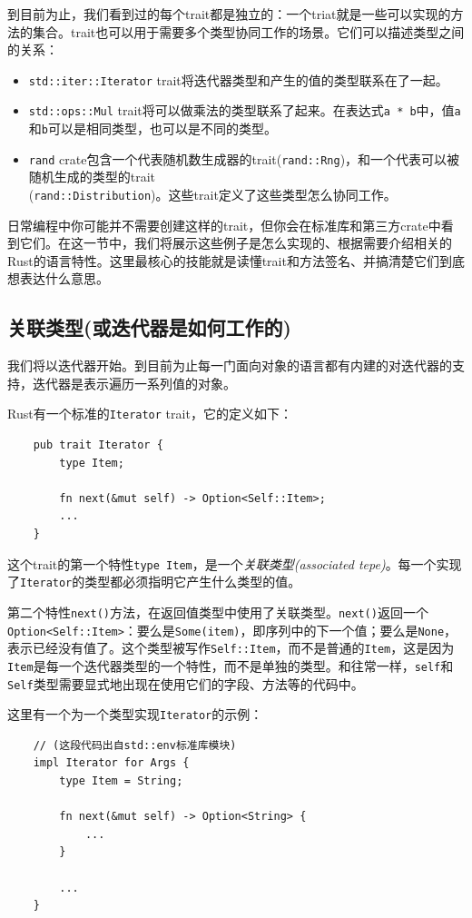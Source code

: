 到目前为止，我们看到过的每个trait都是独立的：一个triat就是一些可以实现的方法的集合。trait也可以用于需要多个类型协同工作的场景。它们可以描述类型之间的关系：
\begin{itemize}
    \item \texttt{std::iter::Iterator} trait将迭代器类型和产生的值的类型联系在了一起。
    \item \texttt{std::ops::Mul} trait将可以做乘法的类型联系了起来。在表达式\texttt{a * b}中，值\texttt{a}和\texttt{b}可以是相同类型，也可以是不同的类型。
    \item \texttt{rand} crate包含一个代表随机数生成器的trait(\texttt{rand::Rng})，和一个代表可以被随机生成的类型的trait\\
    (\texttt{rand::Distribution})。这些trait定义了这些类型怎么协同工作。
\end{itemize}

日常编程中你可能并不需要创建这样的trait，但你会在标准库和第三方crate中看到它们。在这一节中，我们将展示这些例子是怎么实现的、根据需要介绍相关的Rust的语言特性。这里最核心的技能就是读懂trait和方法签名、并搞清楚它们到底想表达什么意思。

\subsection{关联类型(或迭代器是如何工作的)}
我们将以迭代器开始。到目前为止每一门面向对象的语言都有内建的对迭代器的支持，迭代器是表示遍历一系列值的对象。

Rust有一个标准的\texttt{Iterator} trait，它的定义如下：
\begin{verbatim}
    pub trait Iterator {
        type Item;

        fn next(&mut self) -> Option<Self::Item>;
        ...
    }
\end{verbatim}

这个trait的第一个特性\texttt{type Item}，是一个\emph{关联类型(associated tepe)}。每一个实现了\texttt{Iterator}的类型都必须指明它产生什么类型的值。

第二个特性\texttt{next()}方法，在返回值类型中使用了关联类型。\texttt{next()}返回一个\texttt{Option<Self::Item>}：要么是\texttt{Some(item)}，即序列中的下一个值；要么是\texttt{None}，表示已经没有值了。这个类型被写作\texttt{Self::Item}，而不是普通的\texttt{Item}，这是因为\texttt{Item}是每一个迭代器类型的一个特性，而不是单独的类型。和往常一样，\texttt{self}和\texttt{Self}类型需要显式地出现在使用它们的字段、方法等的代码中。

这里有一个为一个类型实现\texttt{Iterator}的示例：
\begin{verbatim}
    // (这段代码出自std::env标准库模块)
    impl Iterator for Args {
        type Item = String;

        fn next(&mut self) -> Option<String> {
            ...
        }

        ...
    }
\end{verbatim}

